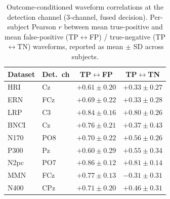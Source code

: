 \begin{table}[t]
\centering
\setlength{\tabcolsep}{6pt}
\caption{Outcome-conditioned waveform correlations at the detection channel (3-channel, fused decision). Per-subject Pearson $r$ between mean true-positive and mean false-positive (TP$\leftrightarrow$FP) / true-negative (TP$\leftrightarrow$TN) waveforms, reported as mean $\pm$ SD across subjects.}
\label{sup:tab-corr}
\begin{tabular}{llcc}
\toprule
Dataset & Det.\ ch & TP$\leftrightarrow$FP & TP$\leftrightarrow$TN \\
\midrule
HRI & Cz & $+0.61 \pm 0.20$ & $+0.33 \pm 0.27$ \\
ERN & FCz & $+0.69 \pm 0.22$ & $+0.33 \pm 0.28$ \\
LRP & C3 & $+0.84 \pm 0.16$ & $+0.80 \pm 0.26$ \\
BNCI & Cz & $+0.76 \pm 0.21$ & $+0.37 \pm 0.43$ \\
N170 & PO8 & $+0.70 \pm 0.22$ & $+0.56 \pm 0.26$ \\
P300 & Pz & $+0.60 \pm 0.29$ & $+0.55 \pm 0.34$ \\
N2pc & PO7 & $+0.86 \pm 0.12$ & $+0.81 \pm 0.14$ \\
MMN & FCz & $+0.77 \pm 0.13$ & $-0.31 \pm 0.31$ \\
N400 & CPz & $+0.71 \pm 0.20$ & $+0.46 \pm 0.31$ \\
\bottomrule
\end{tabular}
\end{table}
